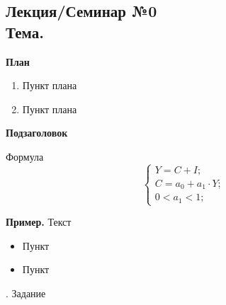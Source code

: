 \documentclass[12pt,a4paper]{article}
\author{Аверьянов Тимофей, Корякин Алексей}
\begin{document}
\begin{center}
\section*{Лекция/Семинар №0 \\
Тема.}
\end{center}
\begin{center}
\textbf{План}
\end{center}
\begin{enumerate}
\item Пункт плана
\item Пункт плана
\end{enumerate}
\begin{center}
\textbf{Подзаголовок}
\end{center}

Формула
\begin{equation}
\begin{cases}
Y = C + I; \\
C = a_0 + a_1 \cdot Y; \\
0 < a_1 < 1;
\end{cases}
\end{equation}

\textbf{Пример.} Текст
\begin{itemize}
\item Пункт
\item Пункт
\end{itemize}

. Задание
\end{document}
